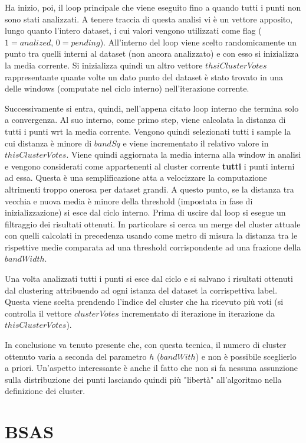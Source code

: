\documentclass[]{report}
\begin{document}
	Ha inizio, poi, il loop principale che viene eseguito fino a quando tutti i punti non sono stati analizzati. A tenere traccia di questa analisi vi è un vettore apposito, lungo quanto l'intero dataset, i cui valori vengono utilizzati come flag ($1=analized$, $0=pending$). All'interno del loop viene scelto randomicamente un punto tra quelli interni al dataset (non ancora analizzato) e con esso si inizializza la media corrente. Si inizializza quindi un altro vettore $thsiClusterVotes$ rappresentante quante volte un dato punto del dataset è stato trovato in una delle windows (computate nel ciclo interno) nell'iterazione corrente.
	
	Successivamente si entra, quindi, nell'appena citato loop interno che termina solo a convergenza. Al suo interno, come primo step, viene calcolata la distanza di tutti i punti wrt la media corrente. Vengono quindi selezionati tutti i sample la cui distanza è minore di $bandSq$  e viene incrementato il relativo valore in $thisClusterVotes$. Viene quindi aggiornata la media interna alla window in analisi e vengono considerati come appartenenti al cluster corrente {\bf tutti} i punti interni ad essa. Questa è una semplificazione atta a velocizzare la computazione altrimenti troppo onerosa per dataset grandi. A questo punto, se la distanza tra vecchia e nuova media è minore della threshold (impostata in fase di inizializzazione) si esce dal ciclo interno. Prima di uscire dal loop si esegue un filtraggio dei risultati ottenuti. In particolare si cerca un merge del cluster attuale con quelli calcolati in precedenza usando come metro di misura la distanza tra le rispettive medie comparata ad una threshold corrispondente ad una frazione della $bandWidth$. 
	
	Una volta analizzati tutti i punti si esce dal ciclo e si salvano i risultati ottenuti dal clustering attribuendo ad ogni istanza del dataset la corrispettiva label. Questa viene scelta prendendo l'indice del cluster che ha ricevuto più voti (si controlla il vettore $clusterVotes$ incrementato di iterazione in iterazione da $thisClusterVotes$). 
	
	In conclusione va tenuto presente che, con questa tecnica, il numero di cluster ottenuto varia a seconda del parametro $h$ ($bandWith$) e non è possibile sceglierlo a priori. Un'aspetto interessante è anche il fatto che non si fa nessuna assunzione sulla distribuzione dei punti lasciando quindi più "libertà" all'algoritmo nella definizione dei cluster.	
	
	
\section*{BSAS}
\end{document}
